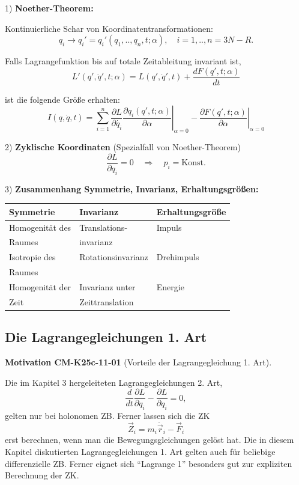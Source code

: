 \documentclass[10pt, letterpaper]{article}
\newcommand{\CustomHeading}[3]{%
  \par\medskip\noindent%
  \textbf{#1 #2} \textnormal{(#3)}.\enskip%
}
\newenvironment{MOT}[2]{\begin{unitbox}\CustomHeading{Motivation}{#1}{#2}}{\end{unitbox}}
\begin{document}
1) \textbf{Noether-Theorem:}

Kontinuierliche Schar von Koordinatentransformationen:
\[q_i \to q_i' = q_i'(q_1,..,q_n,t;\alpha), \quad i=1,..,n=3N-R.\]

Falls Lagrangefunktion bis auf totale Zeitableitung invariant ist,
\[L'(q',\dot{q}',t;\alpha) = L(q',\dot{q}',t) + \frac{dF(q',t;\alpha)}{dt}\]

ist die folgende Größe erhalten:
\[I(q,\dot{q},t) = \sum_{i=1}^n \frac{\partial L}{\partial \dot{q_i}} \left.\frac{\partial q_i(q',t;\alpha)}{\partial \alpha}\right|_{\alpha=0} - \left.\frac{\partial F(q',t;\alpha)}{\partial \alpha}\right|_{\alpha=0}\]

2) \textbf{Zyklische Koordinaten} (Spezialfall von Noether-Theorem)
\[\frac{\partial L}{\partial q_i} = 0 \quad \Rightarrow \quad p_i = \text{Konst.}\]

3) \textbf{Zusammenhang Symmetrie, Invarianz, Erhaltungsgrößen:}

\begin{tabular}{|l|l|l|}
\hline
Symmetrie & Invarianz & Erhaltungsgröße \\
\hline
Homogenität des & Translations- & Impuls \\
Raumes & invarianz & \\
\hline
Isotropie des & Rotationsinvarianz & Drehimpuls \\
Raumes & & \\
\hline
Homogenität der & Invarianz unter & Energie \\
Zeit & Zeittranslation & \\
\hline
\end{tabular}








\pagebreak


\subsection{Die Lagrangegleichungen 1. Art}





\begin{MOT}{CM-K25c-11-01}{Vorteile der Lagrangegleichung 1. Art}
Die im Kapitel 3 hergeleiteten Lagrangegleichungen 2. Art,
\[\frac{d}{dt}\frac{\partial L}{\partial \dot{q}_i} - \frac{\partial L}{\partial q_i} = 0,\]
gelten nur bei holonomen ZB. Ferner lassen sich die ZK
\[\vec{Z}_i = m_i\ddot{\vec{r}}_i-\vec{F}_i\] erst berechnen, wenn man die Bewegungsgleichungen gelöst hat. Die in diesem Kapitel diskutierten Lagrangegleichungen 1. Art gelten auch für beliebige differenzielle ZB. Ferner eignet sich ``Lagrange 1'' besonders gut zur expliziten Berechnung der ZK.
\end{MOT}
\end{document}
